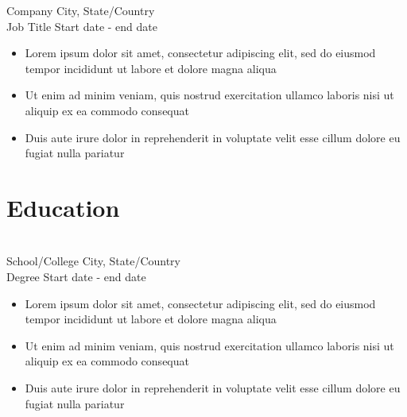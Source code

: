 \documentclass{resume_template}
\begin{document}
\begin{tcbraster}[raster columns=6,raster height=11in,raster width=8.5in,raster column skip=0in,raster row skip=0in,raster force size=false]
\begin{tcolorbox}[main,raster multicolumn=4]
			Company \hfill City, State/Country \\
			Job Title \hfill Start date - end date
			\begin{itemize}
				\item Lorem ipsum dolor sit amet, consectetur adipiscing elit, sed do eiusmod tempor incididunt ut labore et dolore magna aliqua
				\item Ut enim ad minim veniam, quis nostrud exercitation ullamco laboris nisi ut aliquip ex ea commodo consequat
				\item Duis aute irure dolor in reprehenderit in voluptate velit esse cillum dolore eu fugiat nulla pariatur
			\end{itemize}
						
		\section*{Education}
			\vspace*{-0.2in}
			\hrulefill\\
			
			School/College \hfill City, State/Country \\
			Degree \hfill Start date - end date
			\begin{itemize}
				\item Lorem ipsum dolor sit amet, consectetur adipiscing elit, sed do eiusmod tempor incididunt ut labore et dolore magna aliqua
				\item Ut enim ad minim veniam, quis nostrud exercitation ullamco laboris nisi ut aliquip ex ea commodo consequat
				\item Duis aute irure dolor in reprehenderit in voluptate velit esse cillum dolore eu fugiat nulla pariatur
			\end{itemize}			
	\end{tcolorbox}
\end{tcbraster}
\end{document}
